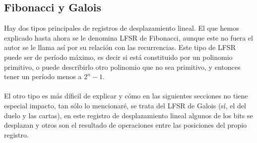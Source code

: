 \subsection{Fibonacci y Galois}
Hay dos tipos principales de registros de desplazamiento lineal. El que hemos explicado hasta ahora se le denomina LFSR de Fibonacci, aunque este no fuera el autor se le llama así por su relación con las recurrencias. Este tipo de LFSR puede ser de período máximo, es decir si está constituido por un polinomio primitivo, o puede describirlo otro polinomio que no sea primitivo, y entonces tener un período menos a $2^n - 1$. \\\\
El otro tipo es más díficil de explicar y cómo en las siguientes secciones no tiene especial impacto, tan sólo lo mencionaré, se trata del LFSR de Galois (sí, el del duelo y las cartas), en este registro de desplazamiento lineal algunos de los bits se desplazan y otros son el resultado de operaciones entre las posiciones del propio registro.
\\




